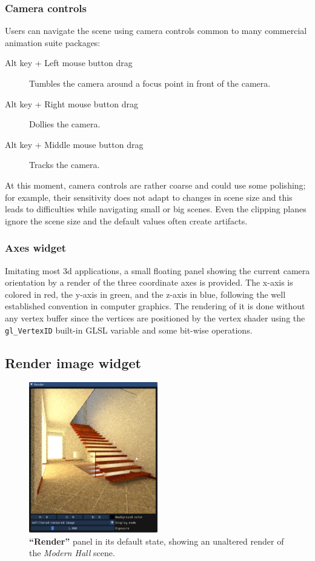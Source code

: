 
\subsubsection{Camera controls}
Users can navigate the scene using camera controls common to many commercial animation suite packages:
\begin{description}
	\item[Alt key + Left mouse button drag] Tumbles the camera around a focus point in front of the camera.
	\item[Alt key + Right mouse button drag] Dollies the camera.
	\item[Alt key + Middle mouse button drag] Tracks the camera. 
\end{description}
At this moment, camera controls are rather coarse and could use some polishing; for example, their sensitivity does not adapt to changes in scene size and this leads to difficulties while navigating small or big scenes. Even the clipping planes ignore the scene size and the default values often create artifacts.

\subsubsection{Axes widget}

Imitating most 3d applications, a small floating panel showing the current camera orientation by a render of the three coordinate axes is provided. The x-axis is colored in red, the y-axis in green, and the z-axis in blue, following the well established convention in computer graphics. The rendering of it is done without any vertex buffer since the vertices are positioned by the vertex shader using the \texttt{gl\_VertexID} built-in GLSL variable and some bit-wise operations. 

\subsection{Render image widget}
\label{image_widget}

\begin{figure}
	\centering
	\includegraphics[width=0.5\textwidth]{chapters/chapter_thetool/imagewidget_full}
	\caption{\textbf{“Render”} panel in its default state, showing an unaltered render of the \textit{Modern Hall} \cite{bitterliscenes} scene.}
	\label{imagewidget_full}
\end{figure}

